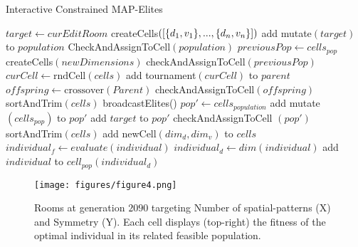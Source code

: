 \documentclass[conference]{IEEEtran}
\begin{document}
\begin{algorithm}
\caption{Interactive Constrained MAP-Elites}\label{alg:IC-MAPE}
\begin{algorithmic}[1]
\State $target \gets curEditRoom$ 
\State createCells$(\protect[\{d_1,v_1\},...,\{d_n,v_n\}])$
     \State add mutate$(target)$ to $population$
\EndFor
\State CheckAndAssignToCell$(population)$ 
 
            \State $previousPop \gets cells_{pop}$
            \State createCells$(newDimensions)$
            \State checkAndAssignToCell$(previousPop)$ 
        \EndIf
                \State $curCell \gets \text{rndCell}(cells)$
                \State add tournament$(curCell)$ to $parent$
            \EndFor
            \State $offspring \gets  \text{crossover}(Parent)$
            \State checkAndAssignToCell$(offspring)$
        \EndRepeat
        \State sortAndTrim$(cells)$
    \EndFor
    \State broadcastElites() 
    \State $pop' \gets cells_{population}$
    \State add mutate$(cells_{pop})$ to $pop'$
    \State add $target$ to $pop'$
    \State checkAndAssignToCell $(pop')$
    \State sortAndTrim$(cells)$
\EndWhile
\EndProcedure
{}
        \State add newCell$(dim_d, dim_v)$ to $cells$
    \EndFor
\EndProcedure
{}
        \State $individual_f \gets evaluate(individual)$ 
        \State $individual_d \gets dim(individual)$
        \State add $individual$ to $cell_{pop}(individual_d)$
    \EndFor
\EndProcedure
\end{algorithmic}
\end{algorithm}

\begin{figure*}[t]
\centerline{\texttt{[image: figures/figure4.png]}}
\caption{Rooms at generation $2090$ targeting Number of spatial-patterns (X) and Symmetry (Y). Each cell displays (top-right) the fitness of the optimal individual in its related feasible population. }
\label{figs:patt_sym}
\end{figure*}
\end{document}
